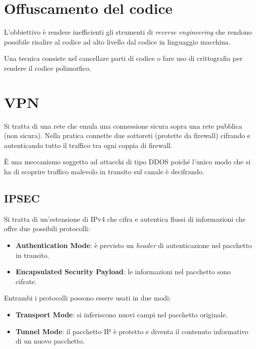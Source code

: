 \section{Offuscamento del codice}
L'obbiettivo è rendere inefficienti gli strumenti di \emph{reverse engineering} che rendono possibile risalire al
codice ad alto livello dal codice in linguaggio macchina.

Una tecnica consiste nel cancellare parti di codice o fare uso di crittografia per rendere il codice polimorfico.

\section{VPN}
Si tratta di una rete che emula una connessione sicura sopra una rete pubblica (non sicura). Nella pratica connette
due sottoreti (protette da firewall) cifrando e autenticando tutto il traffico tra ogni coppia di firewall.

\`E una meccanismo soggetto ad attacchi di tipo DDOS poiché l'unico modo che si ha di scoprire traffico malevolo
in transito sul canale è decifrando.

\subsection{IPSEC}
Si tratta di un'estensione di IPv4 che cifra e autentica flussi di informazioni che offre due possibili protocolli:
\begin{itemize}
	\item \textbf{Authentication Mode}: è previsto un \emph{header} di autenticazione nel pacchetto in transito.
	\item \textbf{Encapsulated Security Payload}: le informazioni nel pacchetto sono cifrate.
\end{itemize}
Entrambi i protocolli possono essere usati in due modi:
\begin{itemize}
	\item \textbf{Transport Mode}: si inferiscono nuovi campi nel pacchetto originale.
	\item \textbf{Tunnel Mode}: il pacchetto IP è protetto e diventa il contenuto informativo di un nuovo pacchetto.
\end{itemize}